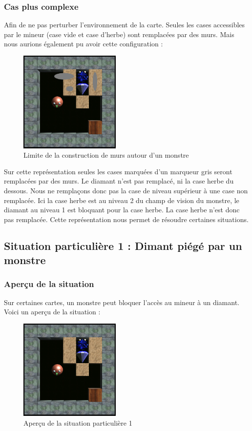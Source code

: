 \documentclass[a4paper,11pt]{article}
\begin{document}
		\subsubsection{Cas plus complexe}
		
Afin de ne pas perturber l'environnement de la carte. Seules les cases accessibles par le mineur (case vide et case d'herbe) sont remplac\'ees par des murs.
Mais nous aurions \'egalement pu avoir cette configuration :
	
		\begin{figure}[h]
			\center
			\includegraphics[width=5cm]{situation1}
			\caption{\label{monstre3} Limite de la construction de murs autour d'un monstre }
		\end{figure}
		
Sur cette repr\'esentation seules les cases marqu\'ees d'un marqueur gris seront remplac\'ees par des murs. Le diamant n'est pas remplac\'e, ni la case herbe du dessous. Nous ne remplaçons donc pas la case de niveau sup\'erieur \`a une case non remplac\'ee. Ici la case herbe est au niveau 2 du champ de vision du monstre, le diamant au niveau 1 est bloquant pour la case herbe. La case herbe n'est donc pas remplac\'ee.
Cette repr\'esentation nous permet de r\'esoudre certaines situations.
	
	\newpage
	\subsection{Situation particuli\`ere 1 : Dimant pi\'eg\'e par un monstre}
	
		\subsubsection{Aper\c cu de la situation}
		
		Sur certaines cartes, un monstre peut bloquer l'acc\`es au mineur \`a un diamant. Voici un aper\c cu de la situation :
		
		\begin{figure}[h]
			\center
			\includegraphics[width=5cm]{situation12}
			\caption{\label{situation1} Aper\c cu de la situation particuli\`ere 1 }
		\end{figure}
			
\end{document}
